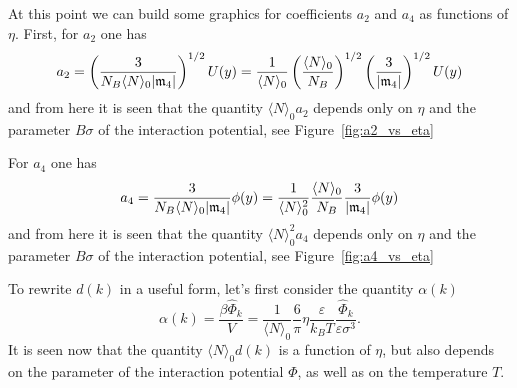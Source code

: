 At this point we can build some graphics for coefficients $a_2$ and $a_4$ as functions of $\eta$.
First, for $a_2$ one has
\begin{equation}
	a_2 = \left(\frac{3}{N_B \langle N \rangle_0 \abs{\mathfrak{m}_4}}\right)^{1/2} U(y) 
	= \frac{1}{\langle N \rangle_0} \left(\frac{\langle N \rangle_0}{N_B}\right)^{1/2} \left(\frac{3}{\abs{\mathfrak{m}_4}}\right)^{1/2} U(y)
\end{equation}
and from here it is seen that the quantity $\langle N \rangle_0 a_2$ depends only on $\eta$ and the parameter $B\sigma$ of the interaction potential, see Figure~\ref{fig:a2_vs_eta}

For $a_4$ one has
\begin{equation}
	a_4 = \frac{3}{N_B \langle N \rangle_0 \abs{\mathfrak{m}_4}} \phi(y) = \frac{1}{\langle N \rangle_0^2} \frac{\langle N \rangle_0}{N_B} \frac{3}{\abs{\mathfrak{m}_4}} \phi(y)
\end{equation}
and from here it is seen that the quantity $\langle N \rangle_0^2 a_4$ depends only on $\eta$ and the parameter $B\sigma$ of the interaction potential, see Figure~\ref{fig:a4_vs_eta}

To rewrite $d(k)$ in a useful form, let's first consider the quantity $\alpha(k)$
\begin{equation}
	\alpha(k) = \frac{\beta \hat{\Phi}_k}{V} = \frac{1}{\langle N \rangle_0} \frac{6}{\pi}\eta \frac{\varepsilon}{k_B T} \frac{\hat{\Phi}_k}{\varepsilon\sigma^3}.
\end{equation}
It is seen now that the quantity $\langle N \rangle_0 d(k)$ is a function of $\eta$, but also depends on the parameter of the interaction potential $\Phi$, as well as on the temperature $T$. 